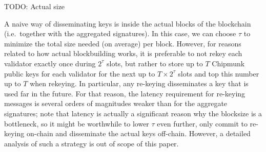 \smallskip
TODO: Actual size

A naive way of disseminating keys is inside the actual blocks of the blockchain (i.e.\ together with the aggregated signatures). In this case, we can choose $\tau$ to minimize the total size needed (on average) per block.
However, for reasons related to how actual blockbuilding works, it is preferable to not rekey each validator exactly once during $2^\tau$ slots, but rather to store up to $T$ Chipmunk public keys for each validator for the next up to $T\times 2^\tau$ slots and top this number up to $T$ when rekeying.
In particular, any re-keying disseminates a key that is used far in the future. For that reason, the latency requirement for re-keying messages is several orders of magnitudes weaker than for the aggregate signatures; note that latency is actually a significant reason why the blocksize is a bottleneck, so
it might be worthwhile to lower $\tau$ even further, only commit to re-keying on-chain and disseminate the actual keys off-chain. However, a detailed analysis of such a strategy is out of scope of this paper.
